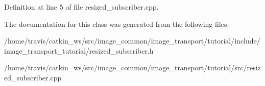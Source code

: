 Definition at line 5 of file resized\-\_\-subscriber.\-cpp.



The documentation for this class was generated from the following files\-:\begin{DoxyCompactItemize}
\item 
/home/travis/catkin\-\_\-ws/src/image\-\_\-common/image\-\_\-transport/tutorial/include/image\-\_\-transport\-\_\-tutorial/resized\-\_\-subscriber.\-h\item 
/home/travis/catkin\-\_\-ws/src/image\-\_\-common/image\-\_\-transport/tutorial/src/resized\-\_\-subscriber.\-cpp\end{DoxyCompactItemize}
